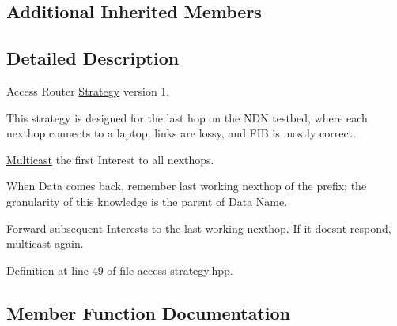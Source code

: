 \subsection*{Additional Inherited Members}


\subsection{Detailed Description}
Access Router \hyperlink{classnfd_1_1fw_1_1Strategy}{Strategy} version 1. 

This strategy is designed for the last hop on the N\+DN testbed, where each nexthop connects to a laptop, links are lossy, and F\+IB is mostly correct.


\begin{DoxyEnumerate}
\item \hyperlink{structnfd_1_1Multicast}{Multicast} the first Interest to all nexthops.
\item When Data comes back, remember last working nexthop of the prefix; the granularity of this knowledge is the parent of Data Name.
\item Forward subsequent Interests to the last working nexthop. If it doesn\textquotesingle{}t respond, multicast again. 
\end{DoxyEnumerate}

Definition at line 49 of file access-\/strategy.\+hpp.



\subsection{Member Function Documentation}
